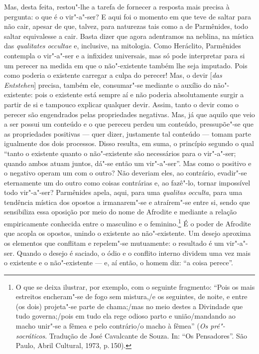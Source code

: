 Mas, desta feita, restou"-lhe a tarefa de fornecer a resposta mais precisa à
pergunta: o que é o vir"-a"-ser? E aqui foi o momento em que teve de saltar
para não cair, apesar de que, talvez, para naturezas tais como a de
Parmênides, todo saltar equivalesse a cair. Basta dizer que agora adentramos
na neblina, na mística das \textit{qualitates occultae} e, inclusive, na mitologia. 
Como Heráclito, Parmênides contempla o vir"-a"-ser e a infixidez universais, 
mas só pode interpretar para si um perecer na medida em que o não"-existente também lhe seja
 imputado. Pois como poderia o existente carregar a culpa do perecer! Mas, o
 devir [\textit{das Entstehen}] precisa, também ele, consumar"-se mediante o
 auxílio do não"-existente: pois o existente está sempre aí e não poderia
 absolutamente surgir a partir de si e tampouco explicar qualquer devir.
 Assim, tanto o devir como o perecer são engendrados pelas propriedades
 negativas. Mas, já que aquilo que veio a ser possui um conteúdo e o que
 pereceu perdeu um conteúdo, pressupõe"-se que as propriedades positivas ---
 quer dizer, justamente tal conteúdo --- tomam parte igualmente dos dois
 processos. Disso resulta, em suma, o princípio segundo o qual ``tanto o
 existente quanto o não"-existente são necessários para o vir"-a"-ser; quando
 ambos atuam juntos, dá"-se então um vir"-a"-ser''. Mas como o positivo e o
 negativo operam um com o outro? Não deveriam eles, ao contrário, evadir"-se
 eternamente um do outro como coisas contrárias e, ao fazê"-lo, tornar
 impossível todo vir"-a"-ser? Parmênides apela, aqui, para uma \textit{qualitas 
 occulta}, para uma tendência mística dos opostos a irmanarem"-se e atraírem"-se 
 entre si, sendo que sensibiliza essa oposição por meio do nome
 de Afrodite e mediante a relação empiricamente conhecida entre o masculino e
 o feminino.\footnote{ O que se deixa ilustrar, por exemplo, com o seguinte
 fragmento: ``Pois os mais estreitos encheram"-se de fogo sem mistura,/e os
 seguintes, de noite, e entre (os dois) projeta"-se parte de chama;/mas no
 meio destes a Divindade que tudo governa;/pois em tudo ela rege odioso parto
 e união/mandando ao macho unir"-se a fêmea e pelo contrário/o macho à
 fêmea'' (\textit{Os pré"-socráticos}. Tradução de José Cavalcante de Souza.
 In: ``Os Pensadores''. São Paulo, Abril Cultural, 1973, p.\,150).} É o poder
 de Afrodite que acopla os opostos, unindo o existente ao não"-existente. Um
 desejo aproxima os elementos que conflitam e repelem"-se mutuamente: o
 resultado é um vir"-a"-ser. Quando o desejo é saciado, o ódio e o conflito
 interno dividem uma vez mais o existente e o não"-existente --- e, aí então,
 o homem diz: ``a coisa perece''.

